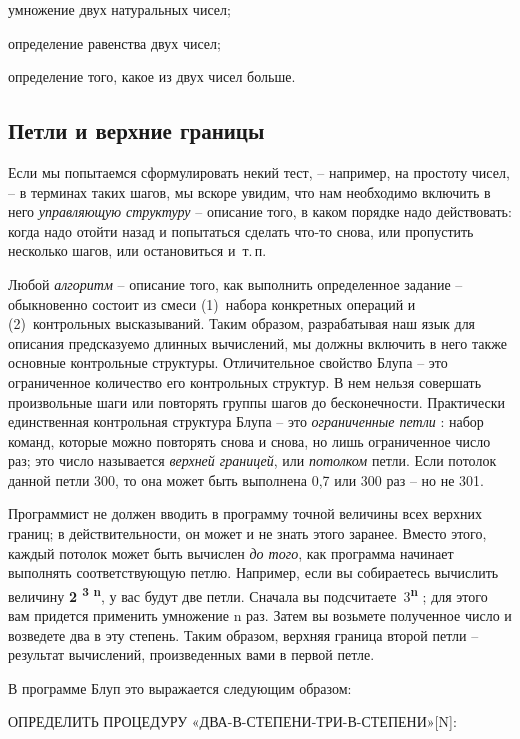 \documentclass[../main.tex]{subfiles}
\begin{document}
умножение двух натуральных чисел;

определение равенства двух чисел;

определение того, какое из двух чисел больше.


\subsection{Петли и верхние границы}

Если мы попытаемся сформулировать некий тест, \--- например, на простоту чисел, \--- в терминах таких шагов, мы вскоре увидим, что нам необходимо включить в него \emph{управляющую структуру} \--- описание того, в каком порядке надо действовать: когда надо отойти назад и попытаться сделать что-то снова, или пропустить несколько шагов, или остановиться и~т.\,п.

Любой \emph{алгоритм} \--- описание того, как выполнить определенное задание \--- обыкновенно состоит из смеси (1)~набора конкретных операций и (2)~контрольных высказываний. Таким образом, разрабатывая наш язык для описания предсказуемо длинных вычислений, мы должны включить в него также основные контрольные структуры. Отличительное свойство Блупа \--- это ограниченное количество его контрольных структур. В нем нельзя совершать произвольные шаги или повторять группы шагов до бесконечности. Практически единственная контрольная структура Блупа \--- это \emph{ограниченные петли} : набор команд, которые можно повторять снова и снова, но лишь ограниченное число раз; это число называется \emph{верхней границей}, или \emph{потолком} петли. Если потолок данной петли 300, то она может быть выполнена 0,7 или 300 раз \--- но не 301.

Программист не должен вводить в программу точной величины всех верхних границ; в действительности, он может и не знать этого заранее. Вместо этого, каждый потолок может быть вычислен \emph{до того}, как программа начинает выполнять соответствующую петлю. Например, если вы собираетесь вычислить величину \textbf{2 \textsuperscript{3 n}}, у вас будут две петли. Сначала вы подсчитаете~3\textbf{\textsuperscript{n}} ; для этого вам придется применить умножение n раз. Затем вы возьмете полученное число и возведете два в эту степень. Таким образом, верхняя граница второй петли \--- результат вычислений, произведенных вами в первой петле.

В программе Блуп это выражается следующим образом:

ОПРЕДЕЛИТЬ ПРОЦЕДУРУ «ДВА-В-СТЕПЕНИ-ТРИ-В-СТЕПЕНИ»{[}N{]}:
\end{document}
